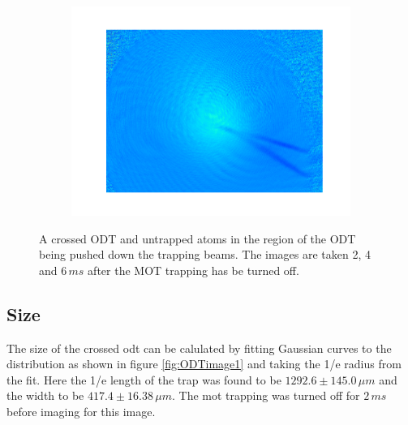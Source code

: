 \begin{figure}[h]
\begin{subfigure}[b]{0.3\textwidth}
        \includegraphics[width=1\textwidth]{figs/ODTimage3.pdf}
    \end{subfigure}
\caption{A crossed ODT and untrapped atoms in the region of the ODT being pushed down the trapping beams. The images are taken 2, 4 and $6\,\unit{ms}$ after the MOT trapping has be turned off.}
\label{fig:crossed_effect}
\end{figure}

\subsection{Size}
The size of the crossed \gls{odt} can be calulated by fitting Gaussian curves to the distribution as shown in figure \ref{fig:ODTimage1} and taking the 1/e radius from the fit. Here the 1/e length of the trap was found to be $1292.6\pm145.0\,\unit{\mu m}$ and the width to be $417.4\pm16.38\,\unit{\mu m}$. The \gls{mot} trapping was turned off for $2\,\unit{ms}$ before imaging for this image.

